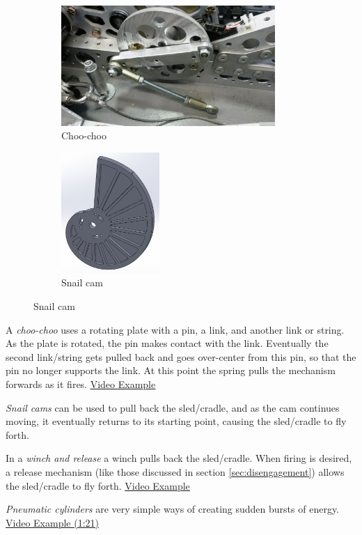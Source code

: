 \begin{figure}[H]
\begin{subfigure}[b]{.32\linewidth}
	\includegraphics[height=1.8in]{imgs/choo_choo.jpeg}
	\caption{Choo-choo}
\end{subfigure}\begin{subfigure}[b]{.32\linewidth}
	\includegraphics[height=1.8in]{imgs/snail_cam.jpeg}
	\caption{Snail cam}
\end{subfigure}
\end{figure}

\begin{asparaenum}[a)]
\item A \textit{choo-choo} uses a rotating plate with a pin, a link, and another link or string. As the plate is rotated, the pin makes contact with the link. Eventually the second link/string gets pulled back and goes over-center from this pin, so that the pin no longer supports the link. At this point the spring pulls the mechanism forwards as it fires. \href{https://www.youtube.com/watch?v=Kh-PVMSF7VU}{\color{red}\underline{Video Example}}

\item \textit{Snail cams} can be used to pull back the sled/cradle, and as the cam continues moving, it eventually returns to its starting point, causing the sled/cradle to fly forth.

\item In a \textit{winch and release} a winch pulls back the sled/cradle. When firing is desired, a release mechanism (like those discussed in section \ref{sec:disengagement}) allows the sled/cradle to fly forth. \href{https://www.youtube.com/watch?v=YFmG_b4B-BE}{\color{red}\underline{Video Example}}

\item \textit{Pneumatic cylinders} are very simple ways of creating sudden bursts of energy. \href{https://youtu.be/1QOYdA5IPJQ?t=81}{\color{red}\underline{Video Example (1:21)}}
\end{asparaenum}

